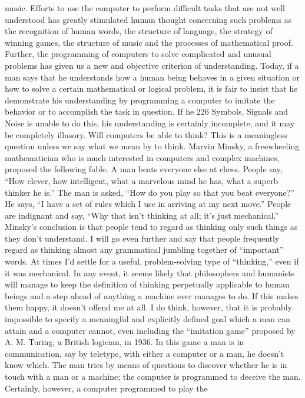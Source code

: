 {{{{{{{{{{{music.
Efforts to use the computer to perform difficult tasks that are
not well understood has greatly stimulated human thought concerning
such problems as the recognition of human words, the structure
of language, the strategy of winning games, the structure of music
and the processes of mathematical proof.
Further, the programming of computers to solve complicated
and unusual problems has given us a new and objective criterion
of understanding. Today, if a man says that he understands how
a human being behaves in a given situation or how to solve a
certain mathematical or logical problem, it is fair to insist that he
demonstrate his understanding by programming a computer to
imitate the behavior or to accomplish the task in question. If he
226
Symbols, Signals and Noise
is unable to do this, his understanding is certainly incomplete, and
it may be completely illusory.
Will computers be able to think? This is a meaningless question
unless we say what we mean by to think. Marvin Minsky, a freewheeling
mathematician who is much interested in computers and
complex machines, proposed the following fable. A man beats
everyone else at chess. People say, “How clever, how intelligent,
what a marvelous mind he has, what a superb thinker he is.” The
man is asked, “How do you play so that you beat everyone?” He
says, “I have a set of rules which I use in arriving at my next move.”
People are indignant and say, “Why that isn’t thinking at all; it’s
just mechanical.”
Minsky’s conclusion is that people tend to regard as thinking
only such things as they don’t understand. I will go even further
and say that people frequently regard as thinking almost any
grammatical jumbling together of “important” words. At times I’d
settle for a useful, problem-solving type of “thinking,” even if it was
mechanical. In any event, it seems likely that philosophers and
humanists will manage to keep the definition of thinking perpetually
applicable to human beings and a step ahead of anything a
machine ever manages to do. If this makes them happy, it doesn’t
offend me at all. I do think, however, that it is probably impossible
to specify a meaningful and explicitly defined goal which a man
can attain and a computer cannot, even including the “imitation
game” proposed by A. M. Turing, a British logician, in 1936.
In this game a man is in communication, say by teletype, with
either a computer or a man, he doesn’t know which. The man tries
by means of questions to discover whether he is in touch with a
man or a machine; the computer is programmed to deceive the
man. Certainly, however, a computer programmed to play the
}}}}}}}}}}}
